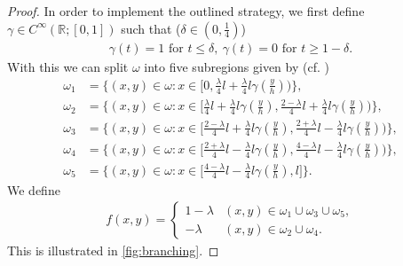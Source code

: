 \documentclass[a4paper, 10pt, twoside, notitlepage]{amsart}
\theoremstyle{plain}
\newcommand{\R}{\mathbb{R}}
\begin{document}
\begin{proof}
			In order to implement the outlined strategy, we first define $\gamma \in C^{\infty}(\R;[0,1])$ such that ($\delta \in (0,\frac{1}{4})$)
			\begin{align*}
				\gamma(t) = 1 \text{ for } t \leq \delta, \ \gamma(t) = 0 \text{ for } t \geq 1-\delta.
			\end{align*}
			With this we can split $\omega$ into five subregions given by (cf. \cite{CC15})
			\begin{align*}
				\omega_1 &= \Big\{(x,y) \in \omega : x \in \big[0 , \frac{\lambda}{4}l +  \frac{\lambda}{4}l \gamma(\frac{y}{h})\big)\Big\},\\
				\omega_2 &= \Big\{(x,y) \in \omega:x \in \big[ \frac{\lambda}{4}l +  \frac{\lambda}{4}l \gamma(\frac{y}{h}), \frac{2-\lambda}{4}l + \frac{\lambda}{4} l \gamma(\frac{y}{h}) \big) \Big\},\\
				\omega_3 &= \Big\{(x,y) \in \omega: x \in \big[ \frac{2-\lambda}{4}l + \frac{\lambda}{4} l \gamma(\frac{y}{h}), \frac{2+\lambda}{4}l - \frac{\lambda}{4}l \gamma(\frac{y}{h}) \big)\Big\},\\
				\omega_4 &= \Big\{(x,y) \in \omega: x\in \big[ \frac{2+\lambda}{4}l - \frac{\lambda}{4}l \gamma(\frac{y}{h}), \frac{4-\lambda}{4} l - \frac{\lambda}{4}l \gamma(\frac{y}{h}) \big) \Big\},\\
				\omega_5 &= \Big\{(x,y) \in \omega: x \in \big[\frac{4-\lambda}{4} l - \frac{\lambda}{4}l \gamma(\frac{y}{h}), l \big] \Big\}.
			\end{align*}
			We define
			\begin{align*}
				f(x,y) = \begin{cases} 1-\lambda & (x,y) \in \omega_1 \cup \omega_3 \cup \omega_5, \\ -\lambda & (x,y) \in \omega_2 \cup \omega_4. \end{cases}
			\end{align*}
                        This is illustrated in \cref{fig:branching}.
                        

\end{proof}
\end{document}

